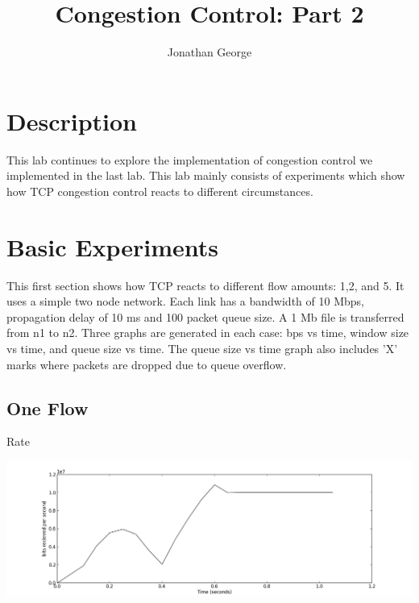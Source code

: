 \documentclass[11pt]{article}
\begin{document}
\lstset{
  language=Python,
  basicstyle=\small,          %
  keywordstyle=\bfseries,
  identifierstyle=,           %
  commentstyle=,              %
  stringstyle=\ttfamily,      %
  showstringspaces=false,     %
  numbers=left,
  numberstyle=\tiny,
  numbersep=5pt,
  frame=tb,
}

\title{Congestion Control: Part 2}

\author{Jonathan George}

\date{}

\maketitle

\section{Description}
This lab continues to explore the implementation of congestion control we implemented in the last lab. This lab mainly consists of experiments which show how TCP congestion control reacts to different circumstances.

\section{Basic Experiments}
This first section shows how TCP reacts to different flow amounts: 1,2, and 5. It uses a simple two node network. Each link has a bandwidth of 10 Mbps, propagation delay of 10 ms and 100 packet queue size. A 1 Mb file is transferred from n1 to n2. Three graphs are generated in each case: bps vs time, window size vs time, and queue size vs time. The queue size vs time graph also includes 'X' marks where packets are dropped due to queue overflow.

\subsection{One Flow}

Rate

\centerline{\includegraphics[width=22cm]{plot_rate_one.png}}
\end{document}
